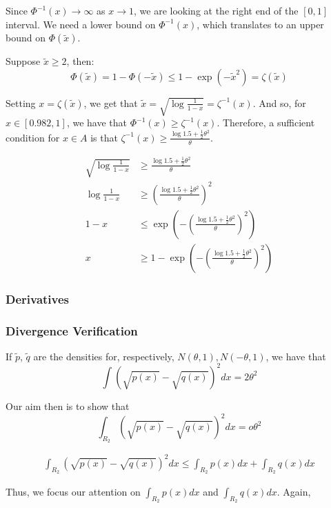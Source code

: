 \documentclass{article}
\begin{document}
Since $\Phi^{-1}(x) \rightarrow \infty$ as $x \rightarrow 1$, we are looking at the right end of the $[0,1]$ interval. We need a lower bound on $\Phi^{-1}(x)$, which translates to an upper bound on $\Phi(\tilde{x})$.

Suppose $\tilde{x} \geq 2$, then:
\[
\Phi(\tilde{x}) = 1 - \Phi(- \tilde{x}) \leq 1 - \exp( - \tilde{x}^2) = \zeta(\tilde{x})
\]

Setting $x = \zeta(\tilde{x})$, we get that $\tilde{x} = \sqrt{ \log \frac{1}{1-x}} = \zeta^{-1}(x)$. And so, for $x \in [0.982, 1]$, we have that $\Phi^{-1}(x) \geq \zeta^{-1}(x)$. Therefore, a sufficient condition for $x \in A$ is that $\zeta^{-1}(x) \geq \frac{ \log 1.5 + \frac{1}{2}\theta^2}{\theta}$. 

\begin{align*}
\sqrt{\log \frac{1}{1-x}} &\geq \frac{\log 1.5 + \frac{1}{2} \theta^2}{\theta} \\
 \log \frac{1}{1-x} &\geq \left(  \frac{\log 1.5 + \frac{1}{2} \theta^2}{\theta} \right)^2 \\
 1-x &\leq \exp\left( - \left(  \frac{\log 1.5 + \frac{1}{2} \theta^2}{\theta} \right)^2 \right) \\
 x &\geq 1 -  \exp\left( - \left(  \frac{\log 1.5 + \frac{1}{2} \theta^2}{\theta} \right)^2 \right)
\end{align*}

\subsubsection{Derivatives}



\subsubsection{Divergence Verification}

If $\tilde{p}$, $\tilde{q}$ are the densities for, respectively, $N(\theta, 1), N(-\theta, 1)$, we have that
\[
\int ( \sqrt{p(x)} - \sqrt{q(x)} )^2 dx = 2 \theta^2
\]

Our aim then is to show that 
\[
\int_{R_2}  ( \sqrt{p(x)} - \sqrt{q(x)} )^2 dx = o \theta^2 
\]

\begin{align*}
\int_{R_2}  ( \sqrt{p(x)} - \sqrt{q(x)} )^2 dx \leq \int_{R_2} p(x) dx + \int_{R_2} q(x) dx
\end{align*}

Thus, we focus our attention on $\int_{R_2} p(x) dx$ and $\int_{R_2} q(x) dx$. Again, 
\end{document}
